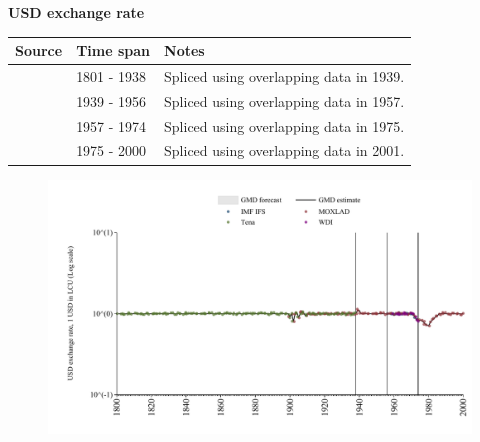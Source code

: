 \documentclass[12pt,a4paper,landscape]{article}
\begin{document}
\begin{adjustbox}{max totalsize={\paperwidth}{\paperheight},center}
\begin{minipage}[t][\textheight][t]{\textwidth}
\vspace*{0.5cm}
{}
\begin{center}
{\Large\bfseries USD exchange rate}
\end{center}
\vspace{0.5cm}
\begin{table}[H]
\centering
\small
\begin{tabular}{|l|l|l|}
\hline
\textbf{Source} & \textbf{Time span} & \textbf{Notes} \\
\hline
\rowcolor{white}\cite{Tena}& 1801 - 1938 &Spliced using overlapping data in 1939. \\
\rowcolor{lightgray}\cite{MOXLAD}& 1939 - 1956 &Spliced using overlapping data in 1957. \\
\rowcolor{white}\cite{IMF_IFS}& 1957 - 1974 &Spliced using overlapping data in 1975. \\
\rowcolor{lightgray}\cite{MOXLAD}& 1975 - 2000 &Spliced using overlapping data in 2001. \\
\hline
\end{tabular}
\end{table}
\begin{figure}[H]
\centering
\includegraphics[width=\textwidth,height=0.6\textheight,keepaspectratio]{graphs/CUB_USDfx.pdf}
\end{figure}
\end{minipage}
\end{adjustbox}
\end{document}
